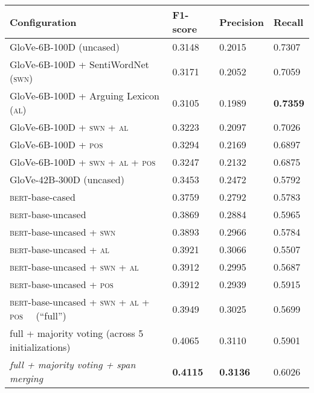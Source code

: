 \renewcommand\arraystretch{1.1}
\begin{tabular}{@{}lRRR@{}}
    \toprule
    \textbf{Configuration} & \textbf{F1-score} & \textbf{Precision} & \textbf{Recall} \\
    \midrule
    GloVe-6B-100D (uncased) & 0.3148 & 0.2015  & 0.7307 \\
    GloVe-6B-100D  + SentiWordNet (\textsc{\textsc{swn}}) & 0.3171 & 0.2052 & 0.7059 \\
    GloVe-6B-100D  + Arguing Lexicon (\textsc{al}) & 0.3105 &	0.1989 & \textbf{0.7359}\\
    GloVe-6B-100D  + \textsc{swn} + \textsc{al} & 0.3223 & 0.2097 & 0.7026\\
    GloVe-6B-100D  + \textsc{pos} & 0.3294 & 0.2169 & 0.6897\\
    GloVe-6B-100D  + \textsc{swn} + \textsc{al} + \textsc{pos} & 0.3247 &	0.2132 & 0.6875\\
    \hline
    GloVe-42B-300D (uncased) & 0.3453 & 0.2472  & 0.5792 \\
    \hline
    \textsc{bert}-base-cased &  0.3759  & 0.2792  &  0.5783 \\
    \hline
    \textsc{bert}-base-uncased        & 0.3869 & 0.2884  & 0.5965 \\
    \textsc{bert}-base-uncased + \textsc{swn} & 0.3893 &	0.2966 &	0.5784 \\
    \textsc{bert}-base-uncased + \textsc{al} & 0.3921 & 0.3066	& 0.5507\\
    \textsc{bert}-base-uncased + \textsc{swn} + \textsc{al} & 0.3912 & 0.2995 & 0.5687\\
    \textsc{bert}-base-uncased + \textsc{pos} & 0.3912 &	0.2939 & 0.5915\\
    \textsc{bert}-base-uncased + \textsc{swn} + \textsc{al} + \textsc{pos} ~~(``full'') & 0.3949 & 0.3025 & 0.5699 \\
    \hline
    full + majority voting (across 5 initializations) & 0.4065 & 0.3110 & 0.5901 \\
    \textit{full + majority voting + span merging} &  \textbf{0.4115} & \textbf{0.3136} & 0.6026\\
    \bottomrule
\end{tabular}

